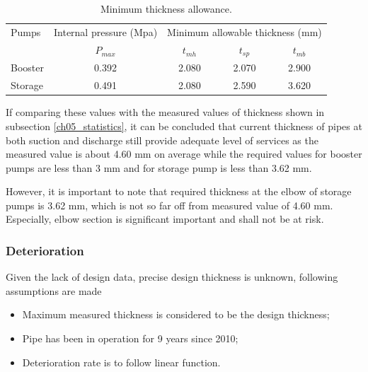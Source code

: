\begin{table}[h]
	\caption{Minimum thickness allowance.}
	\label{ch05_tbl_thicknesscalcresult}
	{\footnotesize
		\begin{tabular}{l|l|p{3cm}|p{3cm}|p{3cm}}
			\hline
			Pumps & \multicolumn{1}{c|}{Internal pressure  (Mpa)} & \multicolumn{3}{c}{Minimum allowable thickness (mm)} \\ 
			\cline{3-5}
			& \multicolumn{1}{c|}{$P_{max}$} & \multicolumn{1}{c|}{$t_{mh}$} & \multicolumn{1}{c|}{$t_{sp}$} & \multicolumn{1}{c}{$t_{mb}$} \\ 
			\hline
			Booster & \multicolumn{1}{c|}{0.392} & \multicolumn{1}{c|}{2.080} & \multicolumn{1}{c|}{2.070} & \multicolumn{1}{c}{2.900} \\ 
			Storage & \multicolumn{1}{c|}{0.491} & \multicolumn{1}{c|}{2.080} & \multicolumn{1}{c|}{2.590} & \multicolumn{1}{c}{3.620} \\ 
			\hline
		\end{tabular}
		
	}
\end{table}

If comparing these values with the measured values of thickness shown in subsection \ref{ch05_statistics}, it can be concluded that current thickness of pipes at both suction and discharge still provide adequate level of services as the measured value is about 4.60 mm on average while the required values for booster pumps are less than 3 mm and for storage pump is less than 3.62 mm. 

However, it is important to note that required thickness at the elbow of storage pumps is 3.62 mm, which is not so far off from measured value of 4.60 mm. Especially, elbow section is significant important and shall not be at risk.

\subsubsection{Deterioration}
Given the lack of design data, precise design thickness is unknown, following assumptions are made

\begin{itemize}
\item Maximum measured thickness is considered to be the design thickness;
\item Pipe has been in operation for 9 years since 2010;
\item Deterioration rate is to follow linear function.
\end{itemize}

